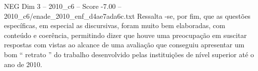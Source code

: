 \begin{textsample}{NEG Dim 3 – 2010\_c6 – Score -7.00 – 2010\_c6/enade\_2010\_enf\_d4ae7ada6c.txt}
Ressalta -se, por fim, que as questões específicas, em especial as discursivas, foram muito bem elaboradas, com conteúdo e coerência, permitindo dizer que houve uma preocupação em suscitar respostas com vistas ao alcance de uma avaliação que conseguiu apresentar um bom “ retrato ” do trabalho desenvolvido pelas instituições de nível superior até o ano de 2010.

\end{textsample}
